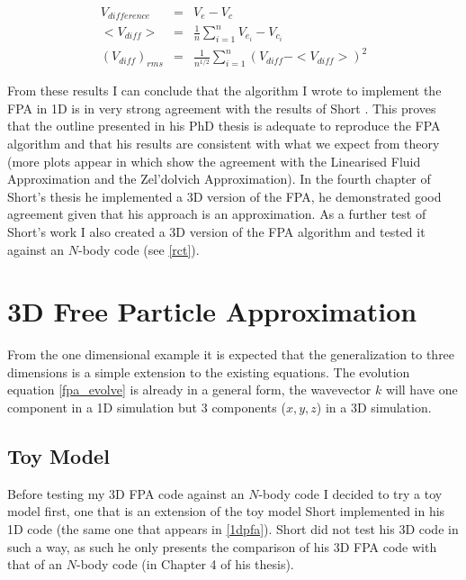 \begin{eqnarray}
 V_{difference} &=& V_e - V_c \nonumber \\
 < V_{diff} >  &=& \frac{1}{n} \sum_{i=1}^{n} V_{e_i} - V_{c_i} \nonumber \\
 (V_{diff})_{rms} &=& \frac{1}{n^{1/2}} \sum_{i=1}^{n} (V_{diff} - < V_{diff} >)^2
\end{eqnarray}


From these results I can conclude that the algorithm I wrote to implement the FPA in 1D is in very strong agreement with the results of Short \citep{bib_short}. This proves that the outline presented in his PhD thesis is adequate to reproduce the FPA algorithm and that his results are consistent with what we expect from theory (more plots appear in \citet{bib_short} which show the agreement with the Linearised Fluid Approximation and the Zel'dolvich Approximation). In the fourth chapter of Short's thesis he implemented a 3D version of the FPA, he demonstrated good agreement given that his approach is an approximation. As a further test of Short's work I also created a 3D version of the FPA algorithm and tested it against an $N$-body code (see \ref{rct}).

\section{3D Free Particle Approximation}
From the one dimensional example it is expected that the generalization to three dimensions is a simple extension to the existing equations. The evolution equation \ref{fpa_evolve} is already in a general form, the wavevector $k$ will have one component in a 1D simulation but 3 components ($x,y,z$) in a 3D simulation.

\subsection{Toy Model}
Before testing my 3D FPA code against an $N$-body code I decided to try a toy model first, one that is an extension of the toy model Short implemented in his 1D code (the same one that appears in \ref{1dpfa}). Short did not test his 3D code in such a way, as such he only presents the comparison of his 3D FPA code with that of an $N$-body code (in Chapter 4 of his thesis).

